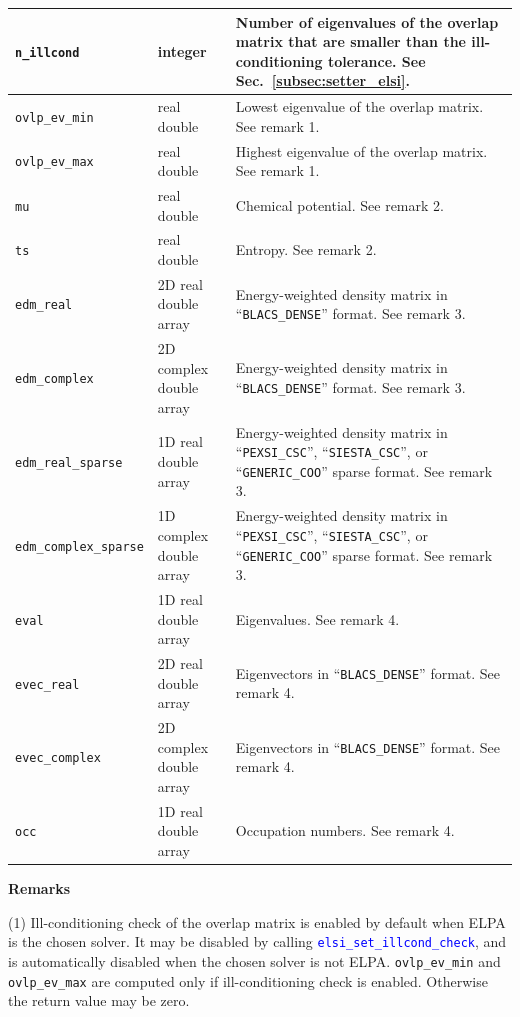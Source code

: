 \documentclass{report}
\newcommand{\api}[1]{\textcolor{blue}{\texttt{#1}}}
\begin{document}
\begin{longtable}[]{|p{35mm}|p{40mm}|p{87mm}|}
\hline
\texttt{n\_illcond}           & integer                 & Number of eigenvalues of the overlap matrix that are smaller than the ill-conditioning tolerance. See Sec.~\ref{subsec:setter_elsi}.\\
\hline
\texttt{ovlp\_ev\_min}        & real double             & Lowest eigenvalue of the overlap matrix. See remark 1.\\
\hline
\texttt{ovlp\_ev\_max}        & real double             & Highest eigenvalue of the overlap matrix. See remark 1.\\
\hline
\texttt{mu}                   & real double             & Chemical potential. See remark 2.\\
\hline
\texttt{ts}                   & real double             & Entropy. See remark 2.\\
\hline
\texttt{edm\_real}            & 2D real double array    & Energy-weighted density matrix in ``\texttt{BLACS\_DENSE}'' format. See remark 3.\\
\hline
\texttt{edm\_complex}         & 2D complex double array & Energy-weighted density matrix in ``\texttt{BLACS\_DENSE}'' format. See remark 3.\\
\hline
\texttt{edm\_real\_sparse}    & 1D real double array    & Energy-weighted density matrix in ``\texttt{PEXSI\_CSC}'', ``\texttt{SIESTA\_CSC}'', or ``\texttt{GENERIC\_COO}'' sparse format. See remark 3.\\
\hline
\texttt{edm\_complex\_sparse} & 1D complex double array & Energy-weighted density matrix in ``\texttt{PEXSI\_CSC}'', ``\texttt{SIESTA\_CSC}'', or ``\texttt{GENERIC\_COO}'' sparse format. See remark 3.\\
\hline
\texttt{eval}                 & 1D real double array    & Eigenvalues. See remark 4.\\
\hline
\texttt{evec\_real}           & 2D real double array    & Eigenvectors in ``\texttt{BLACS\_DENSE}'' format. See remark 4.\\
\hline
\texttt{evec\_complex}        & 2D complex double array & Eigenvectors in ``\texttt{BLACS\_DENSE}'' format. See remark 4.\\
\hline
\texttt{occ}                  & 1D real double array    & Occupation numbers. See remark 4.\\
\hline
\end{longtable}

\textbf{Remarks}

(1) Ill-conditioning check of the overlap matrix is enabled by default when ELPA is the chosen solver. It may be disabled by calling \api{elsi\_set\_illcond\_check}, and is automatically disabled when the chosen solver is not ELPA. \texttt{ovlp\_ev\_min} and \texttt{ovlp\_ev\_max} are computed only if ill-conditioning check is enabled. Otherwise the return value may be zero.
\end{document}

